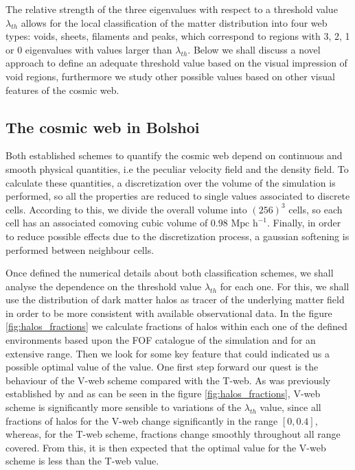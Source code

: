 \documentclass[a4,useAMS,usenatbib,usegraphicx]{latex/mn2e}
\begin{document}
The relative strength of the three eigenvalues with respect to a threshold
value $\lambda_{th}$ allows for the local classification of the matter 
distribution into four web types: voids, sheets, filaments and peaks, 
which correspond to regions with 3, 2, 1 or 0 eigenvalues with values 
larger than $\lambda_{th}$. Below we shall discuss a novel approach to 
define an adequate threshold value based on the visual impression of void
regions, furthermore we study other possible values based on other visual
features of the cosmic web.



\subsection{The cosmic web in Bolshoi}
\label{subsec:web_in_simulations}


Both established schemes to quantify the cosmic web depend on continuous 
and smooth physical quantities, i.e the peculiar velocity field and the 
density field. To calculate these quantities, a discretization over the 
volume of the simulation is performed, so all the properties are reduced 
to single values associated to discrete cells. According to this, we 
divide the overall volume into $(256)^3$ cells, so each cell has an 
associated comoving cubic volume of $0.98 \mbox{ Mpc h}^{-1}$. Finally, in 
order to reduce possible effects due to the discretization process, a 
gaussian softening is performed between neighbour cells.



Once defined the numerical details about both classification schemes, we
shall analyse the dependence on the threshold value $\lambda_{th}$ for 
each one. For this, we shall use the distribution of dark matter halos as 
tracer of the underlying matter field in order to be more consistent with
available observational data. In the figure \ref{fig:halos_fractions} we 
calculate fractions of halos within each one of the defined environments 
based upon the FOF catalogue of the simulation and for an extensive \lth 
range. Then we look for some key feature that could indicated us a 
possible optimal value of the \lth value. One first step forward our quest 
is the behaviour of the V-web scheme compared with the T-web. As was 
previously established by  and as can be seen 
in the figure \ref{fig:halos_fractions}, V-web scheme is significantly more
sensible to variations of the $\lambda_{th}$ value, since all fractions of
halos for the V-web change significantly in the range $[0,0.4]$, whereas, 
for the T-web scheme, fractions change smoothly throughout all \lth range 
covered. From this, it is then expected that the optimal \lth value for 
the V-web scheme is less than the T-web value.
\end{document}
